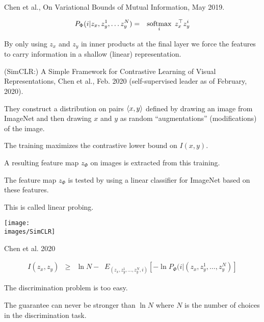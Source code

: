 {Chen et al., On Variational Bounds of Mutual Information, May 2019.



{\huge
\begin{eqnarray*}
P_\Phi(i|z_x,z_y^1,\ldots z_y^N) & = & \operatorname*{softmax}_i\; z_x^\top z_y^i
\end{eqnarray*}
}

\vfill
By only using $z_x$ and $z_y$ in inner products at the final layer we force the features
to carry information in a shallow (linear) representation.


(SimCLR:) A Simple Framework for Contrastive Learning of Visual Representations, Chen et al., Feb. 2020 (self-supervised leader as of February, 2020).

\vfill
They construct a distribution on pairs ${\mbox{$\langle x,y\rangle$}}$ defined by drawing an image from ImageNet and then drawing $x$ and $y$ as random ``augmentations'' (modifications) of the image.

\vfill
The training maximizes the contrastive lower bound on $I(x,y)$.


A resulting feature map $z_\Phi$ on images is extracted from this training.

\vfill
The feature map $z_\Phi$ is tested by using a {\color{red} linear} classifier for ImageNet based on these features.

\vfill
This is called linear probing.


\centerline{\texttt{[image: \\images/SimCLR]}}

\vfill
\centerline{\huge Chen et al. 2020}


{\huge
\begin{eqnarray*}
I(z_x,z_y) & \geq & \ln N - \;\;E_{(z_x,z_y^1,\ldots,z_y^N,i)}\left[-\ln P_\Phi(i|(z_x,z_y^1,\ldots,z_y^N)\right]
\end{eqnarray*}
}

The discrimination problem is too easy.

\vfill
The guarantee can never be stronger than $\ln N$ where $N$ is the number of choices in the discrimination task.


}
